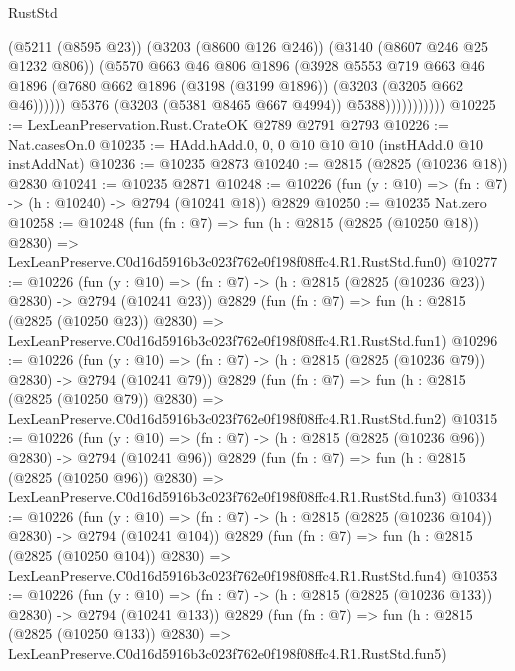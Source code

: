 \begin{lexlean}{RustStd}
\begin{coremodule}
                            (@5211 (@8595 @23))
                            (@3203 (@8600 @126 @246))
                            (@3140 (@8607 @246 @25 @1232 @806))
                            (@5570
                              @663
                              @46
                              @806
                              @1896
                              (@3928
                                @5553
                                @719
                                @663
                                @46
                                @1896
                                (@7680 @662 @1896 (@3198 (@3199 @1896)) (@3203 (@3205 @662 @46))))))
                          @5376
                          (@3203 (@5381 @8465 @667 @4994))
                          @5388)))))))))))
@10225 := LexLeanPreservation.Rust.CrateOK @2789 @2791 @2793
@10226 := Nat.casesOn.{0}
@10235 := HAdd.hAdd.{0, 0, 0} @10 @10 @10 (instHAdd.{0} @10 instAddNat)
@10236 := @10235 @2873
@10240 := @2815 (@2825 (@10236 @18)) @2830
@10241 := @10235 @2871
@10248 := @10226 (fun (y : @10) => (fn : @7) -> (h : @10240) -> @2794 (@10241 @18)) @2829
@10250 := @10235 Nat.zero
@10258 := @10248
    (fun (fn : @7) =>
    fun (h : @2815 (@2825 (@10250 @18)) @2830) =>
    LexLeanPreserve.C0d16d5916b3c023f762e0f198f08ffc4.R1.RustStd.fun0)
@10277 := @10226
    (fun (y : @10) => (fn : @7) -> (h : @2815 (@2825 (@10236 @23)) @2830) -> @2794 (@10241 @23))
    @2829
    (fun (fn : @7) =>
    fun (h : @2815 (@2825 (@10250 @23)) @2830) =>
    LexLeanPreserve.C0d16d5916b3c023f762e0f198f08ffc4.R1.RustStd.fun1)
@10296 := @10226
    (fun (y : @10) => (fn : @7) -> (h : @2815 (@2825 (@10236 @79)) @2830) -> @2794 (@10241 @79))
    @2829
    (fun (fn : @7) =>
    fun (h : @2815 (@2825 (@10250 @79)) @2830) =>
    LexLeanPreserve.C0d16d5916b3c023f762e0f198f08ffc4.R1.RustStd.fun2)
@10315 := @10226
    (fun (y : @10) => (fn : @7) -> (h : @2815 (@2825 (@10236 @96)) @2830) -> @2794 (@10241 @96))
    @2829
    (fun (fn : @7) =>
    fun (h : @2815 (@2825 (@10250 @96)) @2830) =>
    LexLeanPreserve.C0d16d5916b3c023f762e0f198f08ffc4.R1.RustStd.fun3)
@10334 := @10226
    (fun (y : @10) => (fn : @7) -> (h : @2815 (@2825 (@10236 @104)) @2830) -> @2794 (@10241 @104))
    @2829
    (fun (fn : @7) =>
    fun (h : @2815 (@2825 (@10250 @104)) @2830) =>
    LexLeanPreserve.C0d16d5916b3c023f762e0f198f08ffc4.R1.RustStd.fun4)
@10353 := @10226
    (fun (y : @10) => (fn : @7) -> (h : @2815 (@2825 (@10236 @133)) @2830) -> @2794 (@10241 @133))
    @2829
    (fun (fn : @7) =>
    fun (h : @2815 (@2825 (@10250 @133)) @2830) =>
    LexLeanPreserve.C0d16d5916b3c023f762e0f198f08ffc4.R1.RustStd.fun5)

\end{coremodule}
\end{lexlean}
